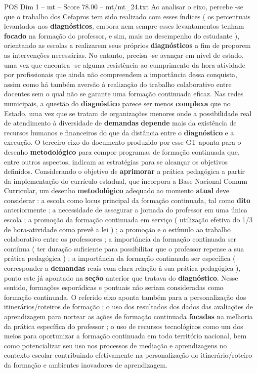 \begin{textsample}{POS Dim 1 – mt – Score 78.00 – mt/mt\_24.txt}
Ao analisar o eixo, percebe -se que o trabalho dos Cefapros tem sido realizado com esses índices ( os percentuais levantados nos \textbf{diagnósticos}, embora nem sempre esses levantamentos tenham \textbf{focado} na formação do professor, e sim, mais no desempenho do estudante ), orientando as escolas a realizarem seus próprios \textbf{diagnósticos} a fim de proporem as intervenções necessárias.
No entanto, precisa -se avançar em nível de estado, uma vez que encontra -se alguma resistência ao cumprimento da hora-atividade por profissionais que ainda não compreendem a importância dessa conquista, assim como há também aversão à realização do trabalho colaborativo entre docentes sem o qual não se garante uma formação continuada eficaz.
Nas redes municipais, a questão do \textbf{diagnóstico} parece ser menos \textbf{complexa} que no Estado, uma vez que se tratam de organizações menores onde a possibilidade real de atendimento à diversidade de \textbf{demandas} \textbf{depende} mais da existência de recursos humanos e financeiros do que da distância entre o \textbf{diagnóstico} e a execução.
O terceiro eixo do documento produzido por esse GT aponta para o desenho \textbf{metodológico} para compor programas de formação continuada que, entre outros aspectos, indicam as estratégias para se alcançar os objetivos definidos.
Considerando o objetivo de \textbf{aprimorar} a prática pedagógica a partir da implementação do currículo estadual, que incorpora a Base Nacional Comum Curricular, um desenho \textbf{metodológico} adequado ao momento \textbf{atual} deve considerar : a escola como locus principal da formação continuada, tal como \textbf{dito} anteriormente ; a necessidade de assegurar a jornada do professor em uma única escola ; a promoção da formação continuada em serviço ( utilização efetiva do 1/3 de hora-atividade como prevê a lei ) ; a promoção e o estímulo ao trabalho colaborativo entre os professores ; a importância da formação continuada ser contínua ( ter duração suficiente para possibilitar que o professor repense a sua prática pedagógica ) ; a importância da formação continuada ser específica ( corresponder a \textbf{demandas} reais com clara relação à sua prática pedagógica ), ponto este já apontado na \textbf{seção} anterior que tratava do \textbf{diagnóstico}.
Nesse sentido, formações esporádicas e pontuais não seriam consideradas como formação continuada.
O referido eixo aponta também para a personalização dos itinerários/roteiros de formação ; o uso dos resultados dos dados das avaliações de aprendizagem para nortear as ações de formação continuada \textbf{focadas} na melhoria da prática específica do professor ; o uso de recursos tecnológicos como um dos meios para oportunizar a formação continuada em todo território nacional, bem como potencializar seu uso nos processos de mediação e aprendizagens no contexto escolar contribuindo efetivamente na personalização do itinerário/roteiro da formação e ambientes inovadores de aprendizagem.

\end{textsample}
